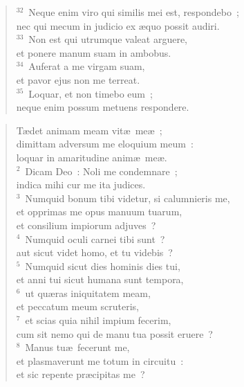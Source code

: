 \begin{flushleft}
\begin{verse}
${}^{32}$~Neque enim viro qui similis mei est, respondebo~;\\ nec qui mecum in judicio ex \ae quo possit audiri.\\
${}^{33}$~Non est qui utrumque valeat arguere,\\ et ponere manum suam in ambobus.\\
${}^{34}$~Auferat a me virgam suam,\\ et pavor ejus non me terreat.\\
${}^{35}$~Loquar, et non timebo eum~;\\ neque enim possum metuens respondere.\end{verse}\end{flushleft}


\begin{flushleft}\begin{verse}\vspace{-19pt}\hspace{6pt}T\ae det animam meam vit\ae\ me\ae~;\\\hspace{6pt} dimittam adversum me eloquium meum~:\\ loquar in amaritudine anim\ae\ me\ae .\\
${}^{2}$~Dicam Deo~: Noli me condemnare~;\\ indica mihi cur me ita judices.\\
${}^{3}$~Numquid bonum tibi videtur, si calumnieris me,\\ et opprimas me opus manuum tuarum,\\ et consilium impiorum adjuves~?\\
${}^{4}$~Numquid oculi carnei tibi sunt~?\\ aut sicut videt homo, et tu videbis~?\\
${}^{5}$~Numquid sicut dies hominis dies tui,\\ et anni tui sicut humana sunt tempora,\\
${}^{6}$~ut qu\ae ras iniquitatem meam,\\ et peccatum meum scruteris,\\
${}^{7}$~et scias quia nihil impium fecerim,\\ cum sit nemo qui de manu tua possit eruere~?\\
${}^{8}$~Manus tu\ae\ fecerunt me,\\ et plasmaverunt me totum in circuitu~:\\ et sic repente pr\ae cipitas me~?\\

\end{verse}
\end{flushleft}
